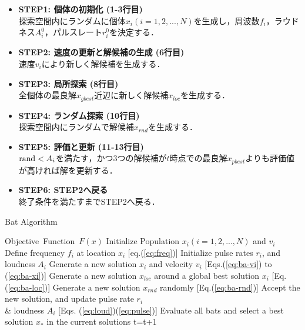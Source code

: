 \documentclass[a4j,11pt]{jarticle}
\begin{document}
\begin{itemize}
\item {\bf STEP1: 個体の初期化 (1-3行目)}\\
探索空間内にランダムに個体$x_i (i=1,2,...,N)$を生成し，周波数$f_i$，ラウドネス$A_i^0$，パルスレート$r_i^0$を決定する．
\item {\bf STEP2: 速度の更新と解候補の生成 (6行目)}\\
速度$v_i$により新しく解候補を生成する．
\item {\bf STEP3: 局所探索 (8行目)}\\
全個体の最良解$x_{gbest}$近辺に新しく解候補$x_{loc}$を生成する．
\item {\bf STEP4: ランダム探索 (10行目)}\\
探索空間内にランダムで解候補$x_{rnd}$を生成する．
\item {\bf STEP5: 評価と更新 (11-13行目)}\\
${\rm rand} < A_i$を満たす，かつ3つの解候補が$t$時点での最良解$x_{pbest}$よりも評価値が高ければ解を更新する．
\item {\bf STEP6: STEP2へ戻る}\\
終了条件を満たすまでSTEP2へ戻る．
\end{itemize}

\begin{algorithm}[H]
\caption{Bat Algorithm}
\label{code:ba}
\begin{algorithmic}[1]
\REQUIRE Objective\ Function\ $F(x)$
\STATE Initialize Population $x_i(i=1,2,..., N)$ and $v_i$\\
\STATE Define frequency $f_i$ at location $x_i$ [eq.(\ref{eq:freq})]
\STATE Initialize pulse rates $r_i$, and loudness $A_i$
\STATE Generate a new solution $x_i$ and velocity $v_i$ [Eqs.(\ref{eq:ba-vi}) to (\ref{eq:ba-xi})]
\STATE Generate a new solution $x_{loc}$ around a global best solution $x_i$ [Eq.(\ref{eq:ba-loc})] 
\ENDIF
\STATE Generate a new solution $x_{rnd}$ randomly [Eq.(\ref{eq:ba-rnd})]
\STATE Accept the new solution, and update pulse rate $r_i$ \\ \& loudness $A_i$ [Eqs. (\ref{eq:loud})(\ref{eq:pulse})]  
\ENDIF
\STATE Evaluate all bats and select a best solution $x_*$ in the current solutions
\ENDFOR
\STATE t=t+1
\ENDWHILE
\end{algorithmic}
\end{algorithm}
\end{document}
